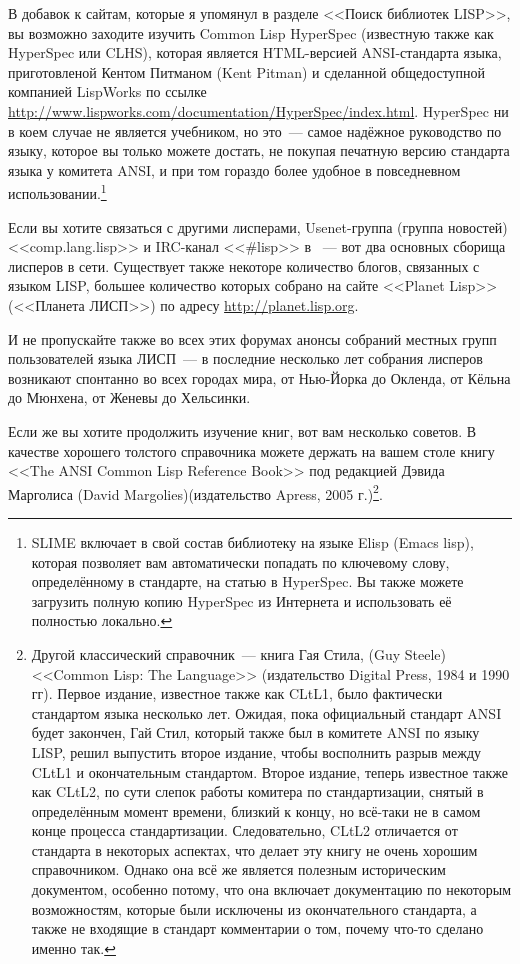 В добавок к сайтам, которые я упомянул в разделе <<Поиск библиотек LISP>>, вы возможно
заходите изучить Common Lisp HyperSpec (известную также как HyperSpec или CLHS), которая
является HTML-версией ANSI-стандарта языка, приготовленой Кентом Питманом (Kent Pitman) и
сделанной общедоступной компанией LispWorks по ссылке
\url{http://www.lispworks.com/documentation/HyperSpec/index.html}. HyperSpec ни в коем
случае не является учебником, но это~--- самое надёжное руководство по языку, которое вы
только можете достать, не покупая печатную версию стандарта языка у комитета ANSI, и при
том гораздо более удобное в повседневном использовании.\footnote{SLIME включает в свой
  состав библиотеку на языке Elisp (Emacs lisp), которая позволяет вам автоматически
  попадать по ключевому слову, определённому в стандарте, на статью в HyperSpec. Вы также
  можете загрузить полную копию HyperSpec из Интернета и использовать её полностью
  локально.}

Если вы хотите связаться с другими лисперами, Usenet-группа (группа новостей)
<<comp.lang.lisp>> и IRC-канал <<\#lisp>> в ~--- вот два основных сборища лисперов в сети. Существует также некоторе количество блогов,
связанных с языком LISP, большее количество которых собрано на сайте <<Planet Lisp>>
(<<Планета ЛИСП>>) по адресу \url{http://planet.lisp.org}.

И не пропускайте также во всех этих форумах анонсы собраний местных групп пользователей
языка ЛИСП~--- в последние несколько лет собрания лисперов возникают спонтанно во всех
городах мира, от Нью-Йорка до Окленда, от Кёльна до Мюнхена, от Женевы до Хельсинки.

Если же вы хотите продолжить изучение книг, вот вам несколько советов. В качестве хорошего
толстого справочника можете держать на вашем столе книгу <<The ANSI Common Lisp Reference
Book>> под редакцией Дэвида Марголиса (David Margolies)(издательство Apress, 2005
г.)\footnote{Другой классический справочник~--- книга Гая Стила, (Guy Steele) <<Common
    Lisp: The Language>> (издательство Digital Press, 1984 и 1990 гг). Первое издание,
    известное также как CLtL1, было фактически стандартом языка несколько лет. Ожидая,
    пока официальный стандарт ANSI будет закончен, Гай Стил, который также был в комитете
    ANSI по языку LISP, решил выпустить второе издание, чтобы восполнить разрыв между
    CLtL1 и окончательным стандартом. Второе издание, теперь известное также как CLtL2, по
    сути слепок работы комитера по стандартизации, снятый в определённым момент времени,
    близкий к концу, но всё-таки не в самом конце процесса стандартизации. Следовательно,
    CLtL2 отличается от стандарта в некоторых аспектах, что делает эту книгу не очень
    хорошим справочником. Однако она всё же является полезным историческим документом,
    особенно потому, что она включает документацию по некоторым возможностям, которые были
    исключены из окончательного стандарта, а также не входящие в стандарт комментарии о
    том, почему что-то сделано именно так.}.

